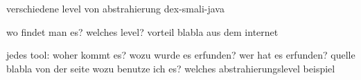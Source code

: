 verschiedene level von abstrahierung\newline
dex-smali-java

wo findet man es?\newline
welches level?\newline
vorteil\newline
blabla aus dem internet\newline

jedes tool:\newline
woher kommt es?\newline
wozu wurde es erfunden?\newline
wer hat es erfunden? quelle\newline
blabla von der seite\newline
wozu benutze ich es?\newline
welches abstrahierungslevel\newline
beispiel\newline
